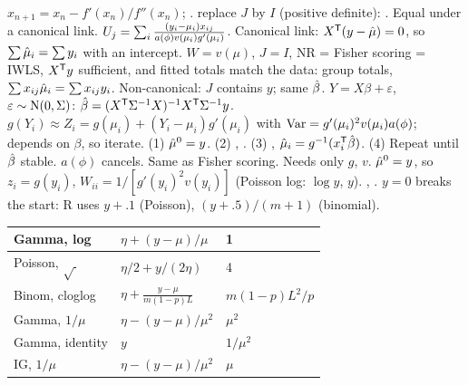 \sk{} $x_{n+1}=x_n-f'(x_n)/f''(x_n)$; .  replace $J$ by $I$ (positive definite): . Equal under a canonical link.
\sk{} $U_j=\sum_{i}\frac{(y_i-\mu_i)x_{ij}}{a(\phi)v(\mu_i)g'(\mu_i)}$. Canonical link: $X^{\mathsf T}(y-\hat{\mu})=0$, so $\sum\hat{\mu}_i=\sum y_i$ with an intercept.
\sk{} $W=v(\mu)$, $J=I$, NR = Fisher scoring = IWLS, $X^{\mathsf T} y$ sufficient, and fitted totals match the data: group totals, $\sum x_{ij}\hat{\mu}_i=\sum x_{ij}y_i$. Non-canonical: $J$ contains $y$; same $\hat{\beta}$.
\sk{} $Y=X\beta+\varepsilon$, $\varepsilon\sim\mathrm{N}(0,\Sigma)$: $\hat{\beta}=(X^{\mathsf T}\Sigma^{-1} X)^{-1} X^{\mathsf T}\Sigma^{-1} y$.  $g(Y_i)\approx Z_i=g(\mu_i)+(Y_i-\mu_i)g'(\mu_i)$ with $\mathrm{Var}=g'(\mu_i)^2v(\mu_i)a(\phi)$; depends on $\beta$, so iterate.
\sk{} (1) $\hat{\mu}^0=y$. (2) , . (3) , $\hat{\mu}_i=g^{-1}(x_i^{\mathsf T}\hat{\beta})$. (4) Repeat until $\hat{\beta}$ stable. $a(\phi)$ cancels. Same as Fisher scoring. Needs only $g$, $v$.
\sk{} $\hat{\mu}^0=y$, so $z_i=g(y_i)$, $W_{ii}=1/[g'(y_i)^2v(y_i)]$ (Poisson log: $\log y$, $y$). , . $y=0$ breaks the start: R uses $y+.1$ (Poisson), $(y+.5)/(m+1)$ (binomial).
{\renewcommand{\arraystretch}{1.08}%
\begin{tabular}{@{}|p{}|p{}|p{}|@{}}\hline
Gamma, log&$\eta+(y-\mu)/\mu$&1\\\hline
Poisson, $\sqrt{\ }$&$\eta/2+y/(2\eta)$&4\\\hline
Binom, cloglog&$\eta+\frac{y-\mu}{m(1-p)L}$&$m(1-p)L^2/p$\\\hline
Gamma, $1/\mu$&$\eta-(y-\mu)/\mu^2$&$\mu^2$\\\hline
Gamma, identity&$y$&$1/\mu^2$\\\hline
IG, $1/\mu$&$\eta-(y-\mu)/\mu^2$&$\mu$\\\hline
\end{tabular}}
